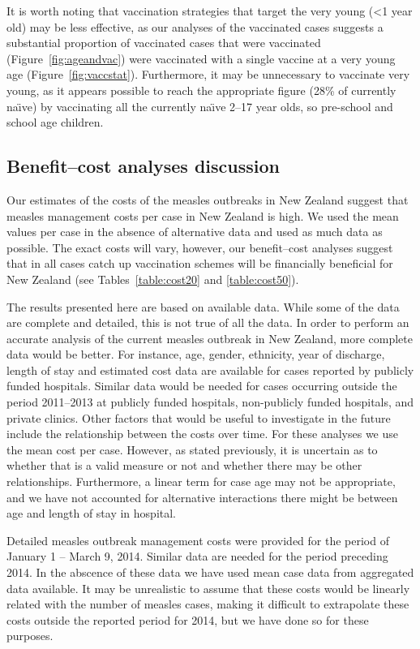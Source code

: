 \documentclass{article}
\begin{document}
It is worth noting that vaccination strategies that target the very young (<1 year old) may be less effective, as our analyses of the vaccinated cases suggests a substantial proportion of vaccinated cases that were vaccinated (Figure~\autoref{fig:ageandvac}) were vaccinated with a single vaccine at a very young age (Figure~\autoref{fig:vaccstat}). Furthermore, it may be unnecessary to vaccinate very young, as it appears possible to reach the appropriate figure (28\% of currently na\"{\i}ve) by vaccinating all the currently na\"{\i}ve 2--17 year olds, so pre-school and school age children.

\subsection{Benefit--cost analyses discussion}

Our estimates of the costs of the measles outbreaks in New Zealand suggest that measles management costs per case in New Zealand is high. We used the mean values per case in the absence of alternative data and used as much data as possible. The exact costs will vary, however, our benefit--cost analyses suggest that in all cases catch up vaccination schemes will be financially beneficial for New Zealand (see Tables~\autoref{table:cost20} and \autoref{table:cost50}).

The results presented here are based on available data. While some of the data are complete and detailed, this is not true of all the data. In order to perform an accurate analysis of the current measles outbreak in New Zealand, more complete data would be better. For instance, age, gender, ethnicity, year of discharge, length of stay and estimated cost data are available for cases reported by publicly funded hospitals. Similar data would be needed for cases occurring outside the period 2011--2013 at publicly funded hospitals, non-publicly funded hospitals, and private clinics. Other factors that would be useful to investigate in the future include the relationship between the costs over time. For these analyses we use the mean cost per case. However, as stated previously, it is uncertain as to whether that is a valid measure or not and whether there may be other relationships. Furthermore, a linear term for case age may not be appropriate, and we have not accounted for alternative interactions there might be between age and length of stay in hospital.

Detailed measles outbreak management costs were provided for the period of January 1 -- March 9, 2014. Similar data are needed for the period preceding 2014. In the abscence of these data we have used mean case data from aggregated data available. It may be unrealistic to assume that these costs would be linearly related with the number of measles cases, making it difficult to extrapolate these costs outside the reported period for 2014, but we have done so for these purposes.
\end{document}
